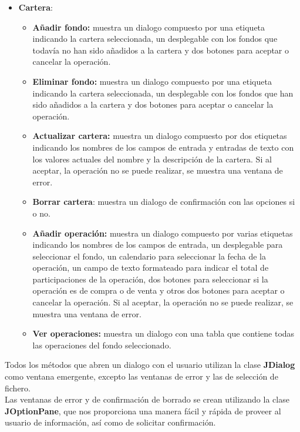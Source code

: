\documentclass[12pt, a4paper]{book}
\begin{document}
\begin{itemize}
	\item \textbf{Cartera}:
	\begin{itemize}
		\item\textbf{Añadir fondo:} muestra un dialogo compuesto por una etiqueta indicando la cartera seleccionada, un desplegable con los fondos que todavía no han sido añadidos a la cartera y dos botones para aceptar o cancelar la operación.
		\item \textbf{Eliminar fondo:} muestra un dialogo compuesto por una etiqueta indicando la cartera seleccionada, un desplegable con los fondos que han sido añadidos a la cartera y dos botones para aceptar o cancelar la operación.
		\item \textbf{Actualizar cartera:} muestra un dialogo compuesto por dos etiquetas indicando los nombres de  los campos de entrada y entradas de texto con los valores actuales del nombre y la descripción de la cartera. Si al aceptar, la operación no se puede realizar, se muestra una ventana de error.
		\item \textbf{Borrar cartera}: muestra un dialogo de confirmación con las opciones si o no.
		\item \textbf{Añadir operación:} muestra un dialogo compuesto por varias etiquetas indicando los nombres de  los campos de entrada, un desplegable para seleccionar el fondo, un calendario para seleccionar la fecha de la operación, un campo de texto formateado para indicar el total de participaciones de la operación, dos botones para seleccionar si la operación es de compra o de venta y otros dos botones para aceptar o cancelar la operación. Si al aceptar, la operación no se puede realizar, se muestra una ventana de error.
		\item \textbf{Ver operaciones:} muestra un dialogo con una tabla que contiene todas las operaciones del fondo seleccionado.\\
	\end{itemize}
\end{itemize}

Todos los métodos que abren un dialogo con el usuario utilizan la clase \textbf{JDialog} como ventana emergente, excepto las ventanas de error y las de selección de fichero.\\

Las ventanas de error y de confirmación de borrado se crean utilizando la clase \textbf{JOptionPane}, que nos proporciona una manera fácil y rápida de proveer al usuario de información, así como de solicitar confirmación. \\
\end{document}
